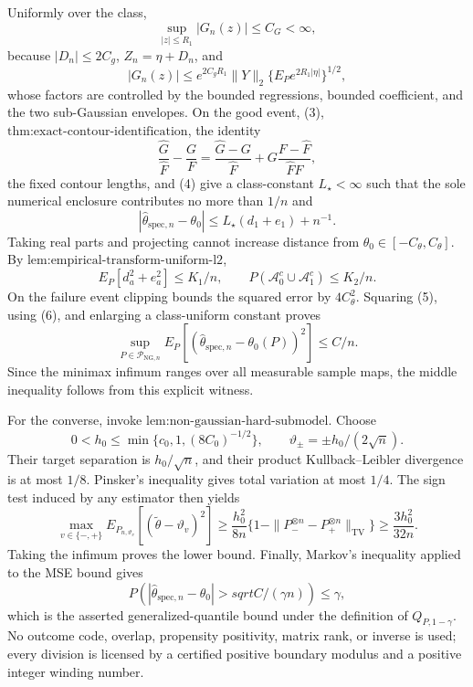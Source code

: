 Uniformly over the class,
\[
 \sup_{|z|\le R_1}|G_n(z)|\le C_G<\infty, \tag{4}
\]
because \(|D_n|\le2C_g\), \(Z_n=\eta+D_n\), and
\[
 |G_n(z)|
 \le e^{2C_gR_1}\|Y\|_2
      \{E_Pe^{2R_1|\eta|}\}^{1/2},
\]
whose factors are controlled by the bounded regressions, bounded coefficient, and the two sub-Gaussian envelopes.  On the good event, (3), \(\text{thm:exact-contour-identification}\), the identity
\[
 \frac{\widehat G}{\widehat F}-\frac G F
 =\frac{\widehat G-G}{\widehat F}
   +G\frac{F-\widehat F}{{\widehat F}F},
\]
the fixed contour lengths, and (4) give a class-constant \(L_{\star}<\infty\) such that the sole numerical enclosure contributes no more than \(1/n\) and
\[
 |\widehat\theta_{\mathrm{spec},n}-\theta_0|
 \le L_{\star}(d_1+e_1)+n^{-1}. \tag{5}
\]
Taking real parts and projecting cannot increase distance from \(\theta_0\in[-C_{\theta},C_{\theta}]\).  By \(\text{lem:empirical-transform-uniform-l2}\),
\[
 E_P[d_a^2+e_a^2]\le K_1/n,
 \qquad
 P(\mathcal A_0^c\cup\mathcal A_1^c)\le K_2/n. \tag{6}
\]
On the failure event clipping bounds the squared error by \(4C_{\theta}^2\).  Squaring (5), using (6), and enlarging a class-uniform constant proves
\[
 \sup_{P\in\mathcal P_{\mathrm{NG},n}}
 E_P[(\widehat\theta_{\mathrm{spec},n}-\theta_0(P))^2]
 \le C/n.
\]
Since the minimax infimum ranges over all measurable sample maps, the middle inequality follows from this explicit witness.

For the converse, invoke \(\text{lem:non-gaussian-hard-submodel}\).  Choose
\[
 0<h_0\le\min\{c_0,1,(8C_0)^{-1/2}\},
 \qquad \vartheta_{\pm}=\pm h_0/(2\sqrt n).
\]
Their target separation is \(h_0/\sqrt n\), and their product Kullback--Leibler divergence is at most \(1/8\).  Pinsker's inequality gives total variation at most \(1/4\).  The sign test induced by any estimator then yields
\[
 \max_{v\in\{-,+\}}
 E_{P_{n,\vartheta_v}}[(\widetilde\theta-\vartheta_v)^2]
 \ge\frac{h_0^2}{8n}
 \{1-\|P_-^{\otimes n}-P_+^{\otimes n}\|_{\mathrm{TV}}\}
 \ge\frac{3h_0^2}{32n}.
\]
Taking the infimum proves the lower bound.  Finally, Markov's inequality applied to the MSE bound gives
\[
 P\left(|\widehat\theta_{\mathrm{spec},n}-\theta_0|>sqrt{C/(\gamma n)}\right)
 \le\gamma,
\]
which is the asserted generalized-quantile bound under the definition of \(Q_{P,1-\gamma}\).  No outcome code, overlap, propensity positivity, matrix rank, or inverse is used; every division is licensed by a certified positive boundary modulus and a positive integer winding number.